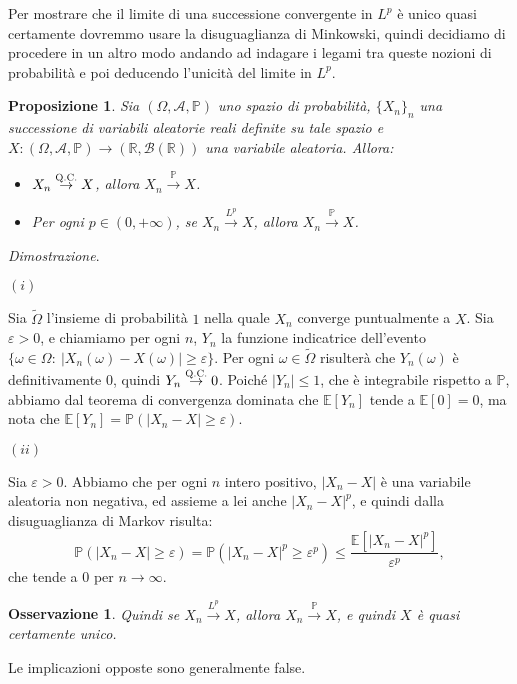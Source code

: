 \documentclass[11pt]{book}
\makeatletter
\theoremstyle{Definizione}
\theoremstyle{TeoremaProposizioneLemmaCorollario}
\newtheorem{mypropo}[myteo]{Proposizione}
\theoremstyle{OsservazioneNota}
\newtheorem{myobs}{Osservazione}[section]
\renewenvironment{proof}[1][\proofname]{\par
  \normalfont \topsep6\p@\@plus6\p@\relax
  \trivlist
  \item[\hskip\labelsep
        \itshape
    #1\@addpunct{.}]\ignorespaces
}{%
  \endtrivlist\@endpefalse
}
\newcommand{\R}{\mathbb{R}}
\renewcommand{\P}{\mathbb{P}}
\newcommand{\E}{\mathbb{E}}
\newcommand{\toqc}{\overset{\textsc{Q.C.}}{\to}}
\newcommand{\toP}{\overset{\P}{\to}}
\newcommand{\toL}[1]{\overset{L^{#1}}{\to}}
\renewenvironment{proof}{\textsl{Dimostrazione}.}{}
\makeatother
\begin{document}
\noindent
Per mostrare che il limite di una successione convergente in $L^p$ è unico quasi certamente dovremmo usare la disuguaglianza di Minkowski, quindi decidiamo di procedere in un altro modo andando ad indagare i legami tra queste nozioni di probabilità e poi deducendo l'unicità del limite in $L^p$.
\begin{boxpro}
\begin{mypropo}
Sia $(\Omega,\mathcal{A},\P)$ uno spazio di probabilità, $\{X_n\}_n$ una successione di variabili aleatorie reali definite su tale spazio e $X: (\Omega,\mathcal{A},\P) \longrightarrow (\R,\mathcal{B}(\R))$ una variabile aleatoria. Allora:
\begin{itemize}
\item[$(i)$] $X_n \toqc X$, allora $X_n \toP X$.
\item[$(ii)$] Per ogni $p\in (0,+\infty)$, se $X_n \toL{p} X$, allora $X_n \toP X$.
\end{itemize}
\end{mypropo}
\tcblower
\begin{proof}
\hfill
\begin{flushleft}
$(i)$
\end{flushleft}
Sia $\widetilde{\Omega}$ l'insieme di probabilità $1$ nella quale $X_n$ converge puntualmente a $X$. Sia $\varepsilon> 0$, e chiamiamo per ogni $n$, $Y_n$ la funzione indicatrice dell'evento $\{\omega\in \Omega:\ |X_n(\omega)-X(\omega)|\geq \varepsilon\}$. Per ogni $\omega\in \widetilde{\Omega}$ risulterà che $Y_n(\omega)$ è definitivamente 0, quindi $Y_n\toqc 0$. Poiché $|Y_n| \leq 1$, che è integrabile rispetto a $\P$, abbiamo dal teorema di convergenza dominata che $\E[Y_n]$ tende a $\E[0] = 0$, ma nota che $\E[Y_n] = \P(|X_n-X| \geq \varepsilon)$.
\begin{flushleft}
$(ii)$
\end{flushleft}
Sia $\varepsilon>0$. Abbiamo che per ogni $n$ intero positivo, $|X_n-X|$ è una variabile aleatoria non negativa, ed assieme a lei anche $|X_n-X|^p$, e quindi dalla disuguaglianza di Markov risulta:
$$
\P(|X_n-X| \geq \varepsilon) = \P(|X_n-X|^p\geq \varepsilon^p) \leq \frac{\E[|X_n-X|^p]}{\varepsilon^p},
$$
che tende a $0$ per $n\to \infty$.
\end{proof}
\end{boxpro}
\begin{myobs}
Quindi se $X_n \toL{p} X$, allora $X_n \toP X$, e quindi $X$ è quasi certamente unico.
\end{myobs}
Le implicazioni opposte sono generalmente false.
\end{document}
